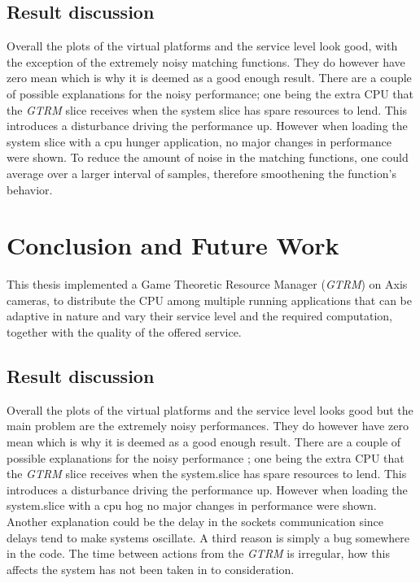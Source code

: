 \documentclass[nobiblatex]{LTHthesis}
\begin{document}
\section{Result discussion}

Overall the plots of the virtual platforms and the service level look good,
with the exception of the extremely noisy matching functions. They do 
however have zero mean which is why it is deemed as a good enough result.
There are a couple of possible explanations for the noisy performance; one
being the extra CPU that the \emph{GTRM} slice receives when the system slice has
spare resources to lend. This introduces a disturbance driving the 
performance up. However when loading the system slice with a cpu hunger
application, no major changes in performance were shown.
To reduce the amount of noise in the matching functions, one could average
over a larger interval of samples, therefore smoothening the function's
behavior.

\chapter{Conclusion and Future Work}
\label{chp:conclusion}

This thesis implemented a Game Theoretic Resource Manager (\emph{GTRM}) on Axis
cameras, to distribute the CPU among multiple running applications that can
be adaptive in nature and vary their service level and the required
computation, together with the quality of the offered service.


\section{Result discussion}

Overall the plots of the virtual platforms and the service level looks good but the main problem are
the extremely noisy performances. They do however have zero mean which is why it is deemed as a good enough result.
There are a couple of possible explanations for the noisy performance ; one being the extra CPU that the \emph{GTRM} slice receives when the system.slice has
spare resources to lend. This introduces a disturbance driving the performance up. However when loading the system.slice with a cpu hog no major changes in performance were shown.
Another explanation could be the delay in the sockets communication since delays tend to make systems oscillate. 
A third reason is simply a bug somewhere in the code.
The time between actions from the \emph{GTRM} is irregular, how this affects the system has not been taken in to consideration.
\end{document}
